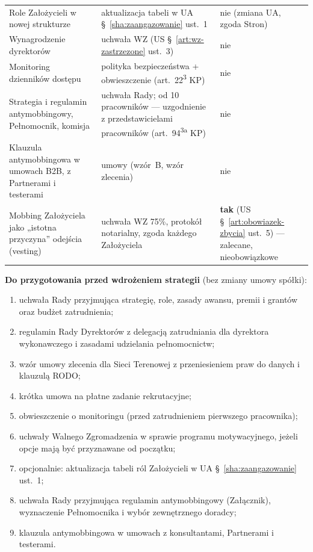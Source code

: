 \documentclass[11pt,a4paper]{report}
\newcommand{\US}[1]{US §~#1}
\newcommand{\UA}[1]{UA §~#1}
\begin{document}
\begin{center}
\begin{tabularx}{\linewidth}{@{}>{\raggedright\arraybackslash}X >{\raggedright\arraybackslash}p{3.6cm} >{\raggedright\arraybackslash}p{4.0cm}@{}}
Role Założycieli w nowej strukturze & aktualizacja tabeli w \UA{\ref{sha:zaangazowanie} ust.~1} & nie (zmiana UA, zgoda Stron) \\
Wynagrodzenie dyrektorów & uchwała WZ (\US{\ref{art:wz-zastrzezone} ust.~3}) & nie \\
Monitoring dzienników dostępu & polityka bezpieczeństwa + obwieszczenie (art.~22\textsuperscript{3} KP) & nie \\
Strategia i regulamin antymobbingowy, Pełnomocnik, komisja & uchwała Rady; od 10 pracowników --- uzgodnienie z przedstawicielami pracowników (art.~94\textsuperscript{3a} KP) & nie \\
Klauzula antymobbingowa w umowach B2B, z Partnerami i testerami & umowy (wzór~B, wzór zlecenia) & nie \\
Mobbing Założyciela jako „istotna przyczyna” odejścia (vesting) & uchwała WZ 75\%, protokół notarialny, zgoda każdego Założyciela & \textbf{tak} (\US{\ref{art:obowiazek-zbycia} ust.~5}) --- zalecane, nieobowiązkowe \\
\bottomrule
\end{tabularx}
\end{center}

\textbf{Do przygotowania przed wdrożeniem strategii} (bez zmiany umowy spółki):
\begin{enumerate}
  \item uchwała Rady przyjmująca strategię, role, zasady awansu, premii i grantów oraz budżet zatrudnienia;
  \item regulamin Rady Dyrektorów z delegacją zatrudniania dla dyrektora wykonawczego i zasadami udzielania pełnomocnictw;
  \item wzór umowy zlecenia dla Sieci Terenowej z przeniesieniem praw do danych i klauzulą RODO;
  \item krótka umowa na płatne zadanie rekrutacyjne;
  \item obwieszczenie o monitoringu (przed zatrudnieniem pierwszego pracownika);
  \item uchwały Walnego Zgromadzenia w sprawie programu motywacyjnego, jeżeli opcje mają być przyznawane od początku;
  \item opcjonalnie: aktualizacja tabeli ról Założycieli w \UA{\ref{sha:zaangazowanie} ust.~1};
  \item uchwała Rady przyjmująca regulamin antymobbingowy (Załącznik), wyznaczenie Pełnomocnika i wybór zewnętrznego doradcy;
  \item klauzula antymobbingowa w umowach z konsultantami, Partnerami i testerami.
\end{enumerate}
\end{document}
